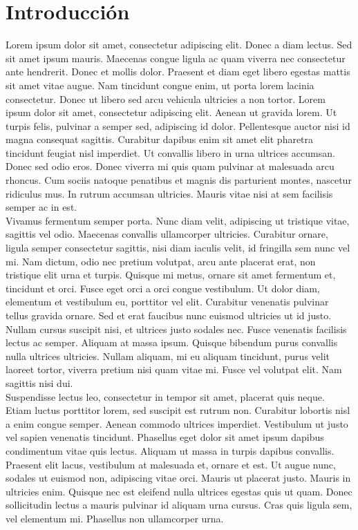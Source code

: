 \chapter*{Introducción}
\label{ch:introduccion}

Lorem ipsum dolor sit amet, consectetur adipiscing elit. Donec a diam lectus. Sed sit amet ipsum mauris. Maecenas congue ligula ac quam viverra nec consectetur ante hendrerit. Donec et mollis dolor. Praesent et diam eget libero egestas mattis sit amet vitae augue. Nam tincidunt congue enim, ut porta lorem lacinia consectetur. Donec ut libero sed arcu vehicula ultricies a non tortor. Lorem ipsum dolor sit amet, consectetur adipiscing elit. Aenean ut gravida lorem. Ut turpis felis, pulvinar a semper sed, adipiscing id dolor. Pellentesque auctor nisi id magna consequat sagittis. Curabitur dapibus enim sit amet elit pharetra tincidunt feugiat nisl imperdiet. Ut convallis libero in urna ultrices accumsan. Donec sed odio eros. Donec viverra mi quis quam pulvinar at malesuada arcu rhoncus. Cum sociis natoque penatibus et magnis dis parturient montes, nascetur ridiculus mus. In rutrum accumsan ultricies. Mauris vitae nisi at sem facilisis semper ac in est. \\


Vivamus fermentum semper porta. Nunc diam velit, adipiscing ut tristique vitae, sagittis vel odio. Maecenas convallis ullamcorper ultricies. Curabitur ornare, ligula semper consectetur sagittis, nisi diam iaculis velit, id fringilla sem nunc vel mi. Nam dictum, odio nec pretium volutpat, arcu ante placerat erat, non tristique elit urna et turpis. Quisque mi metus, ornare sit amet fermentum et, tincidunt et orci. Fusce eget orci a orci congue vestibulum. Ut dolor diam, elementum et vestibulum eu, porttitor vel elit. Curabitur venenatis pulvinar tellus gravida ornare. Sed et erat faucibus nunc euismod ultricies ut id justo. Nullam cursus suscipit nisi, et ultrices justo sodales nec. Fusce venenatis facilisis lectus ac semper. Aliquam at massa ipsum. Quisque bibendum purus convallis nulla ultrices ultricies. Nullam aliquam, mi eu aliquam tincidunt, purus velit laoreet tortor, viverra pretium nisi quam vitae mi. Fusce vel volutpat elit. Nam sagittis nisi dui. \\


Suspendisse lectus leo, consectetur in tempor sit amet, placerat quis neque. Etiam luctus porttitor lorem, sed suscipit est rutrum non. Curabitur lobortis nisl a enim congue semper. Aenean commodo ultrices imperdiet. Vestibulum ut justo vel sapien venenatis tincidunt. Phasellus eget dolor sit amet ipsum dapibus condimentum vitae quis lectus. Aliquam ut massa in turpis dapibus convallis. Praesent elit lacus, vestibulum at malesuada et, ornare et est. Ut augue nunc, sodales ut euismod non, adipiscing vitae orci. Mauris ut placerat justo. Mauris in ultricies enim. Quisque nec est eleifend nulla ultrices egestas quis ut quam. Donec sollicitudin lectus a mauris pulvinar id aliquam urna cursus. Cras quis ligula sem, vel elementum mi. Phasellus non ullamcorper urna.
